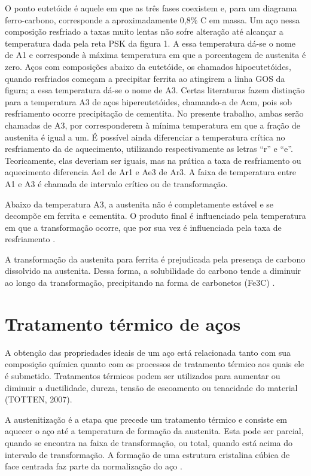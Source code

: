 \documentclass[brazil,dissertacao,epusp]{usp}
\begin{document}
O ponto eutetóide é aquele em que as três fases coexistem e, para um diagrama ferro-carbono, corresponde a aproximadamente 0,8\% C em massa. Um aço nessa composição resfriado a taxas muito lentas não sofre alteração até alcançar a temperatura dada pela reta PSK da figura 1. A essa temperatura dá-se o nome de A1 e corresponde à máxima temperatura em que a porcentagem de austenita é zero. Aços com composições abaixo da eutetóide, os chamados hipoeutetóides, quando resfriados começam a precipitar ferrita ao atingirem a linha GOS da figura; a essa temperatura dá-se o nome de A3. Certas literaturas fazem distinção para a temperatura A3 de aços hipereutetóides, chamando-a de Acm, pois sob resfriamento ocorre precipitação de cementita. No presente trabalho, ambas serão chamadas de A3, por corresponderem à mínima temperatura em que a fração de austenita é igual a um. É possível ainda diferenciar a temperatura crítica no resfriamento da de aquecimento, utilizando respectivamente as letras ``r'' e ``e''. Teoricamente, elas deveriam ser iguais, mas na prática a taxa de resfriamento ou aquecimento diferencia Ae1 de Ar1 e Ae3 de Ar3. A faixa de temperatura entre A1 e A3 é chamada de intervalo crítico ou de transformação.

Abaixo da temperatura A3, a austenita não é completamente estável e se decompõe em ferrita e cementita. O produto final é influenciado pela temperatura em que a transformação ocorre, que por sua vez é influenciada pela taxa de resfriamento \cite{Digges1960}.

A transformação da austenita para ferrita é prejudicada pela presença de carbono dissolvido na austenita. Dessa forma, a solubilidade do carbono tende a diminuir ao longo da transformação, precipitando na forma de carbonetos (Fe3C) \cite{Totten2006}.

\section{Tratamento térmico de aços}

A obtenção das propriedades ideais de um aço está relacionada tanto com sua composição química quanto com os processos de tratamento térmico aos quais ele é submetido. Tratamentos térmicos podem ser utilizados para aumentar ou diminuir a ductilidade, dureza, tensão de escoamento ou tenacidade do material (TOTTEN, 2007).

A austenitização é a etapa que precede um tratamento térmico e consiste em aquecer o aço até a temperatura de formação da austenita. Esta pode ser parcial, quando se encontra na faixa de transformação, ou total, quando está acima do intervalo de transformação. A formação de uma estrutura cristalina cúbica de face centrada faz parte da normalização do aço \cite{ASM1991}.
\end{document}
